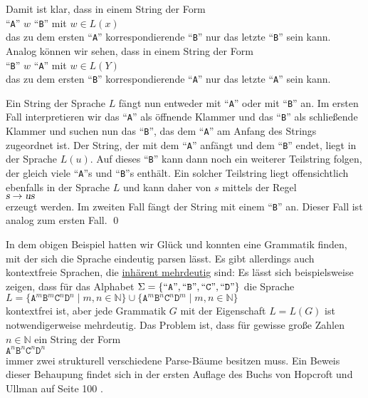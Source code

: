 Damit ist klar, dass in einem String der Form
\\[0.2cm]
\hspace*{1.3cm}
``\texttt{A}'' $w$ ``\texttt{B}'' \quad mit $w \in L(x)$ 
\\[0.2cm]
das zu dem ersten ``\texttt{A}'' korrespondierende ``\texttt{B}'' nur das letzte ``\texttt{B}'' sein kann.
Analog k\"onnen wir sehen, dass in einem String der Form
\\[0.2cm]
\hspace*{1.3cm}
``\texttt{B}'' $w$ ``\texttt{A}'' \quad mit $w \in L(Y)$ 
\\[0.2cm]
das zu dem ersten ``\texttt{B}'' korrespondierende ``\texttt{A}'' nur das letzte ``\texttt{A}'' sein kann.

Ein String der Sprache $L$ f\"angt nun entweder mit ``\texttt{A}'' oder mit ``\texttt{B}''
an.  Im ersten Fall interpretieren wir das ``\texttt{A}'' als \"offnende Klammer und 
das ``\texttt{B}'' als schlie{\ss}ende Klammer und suchen nun das ``\texttt{B}'', das dem
``\texttt{A}'' am Anfang des Strings zugeordnet ist.  Der String, der mit dem
``\texttt{A}'' anf\"angt und dem ``\texttt{B}'' endet, liegt in der Sprache $L(u)$.
Auf dieses ``\texttt{B}'' kann dann noch ein weiterer Teilstring folgen, der
gleich viele ``\texttt{A}''s und ``\texttt{B}''s enth\"alt.  Ein solcher Teilstring liegt
offensichtlich ebenfalls in der Sprache $L$ und kann daher von $s$ mittels der Regel
\\[0.2cm]
\hspace*{1.3cm}
$\textsl{s} \rightarrow \textsl{u}\textsl{s}$
\\[0.2cm]
erzeugt werden.
Im zweiten Fall f\"angt der String mit einem ``\texttt{B}'' an.  Dieser Fall ist
analog zum ersten Fall.    \qed
\vspace*{0.3cm}

In dem obigen Beispiel hatten wir Gl\"uck und konnten eine Grammatik finden, mit der sich
die Sprache eindeutig parsen l\"asst.  Es  gibt allerdings auch kontextfreie Sprachen, die 
\href{http://en.wikipedia.org/wiki/Ambiguous_grammar#Inherently_ambiguous_languages}{inh\"arent mehrdeutig}
sind: Es l\"asst sich beispielsweise zeigen, dass f\"ur das Alphabet 
$\Sigma =  \{ \mbox{``\texttt{A}''}, \mbox{``\texttt{B}''}, \mbox{``\texttt{C}''}, \mbox{``\texttt{D}''} \}$
die Sprache
\\[0.2cm]
\hspace*{1.3cm}
$L =  \bigl\{ \mathtt{A}^m \mathtt{B}^m \mathtt{C}^n \mathtt{D}^n \mid m, n \in \mathbb{N} \bigr\}
 \cup \bigl\{ \mathtt{A}^m \mathtt{B}^n \mathtt{C}^n \mathtt{D}^m \mid m, n \in \mathbb{N} \bigr\}
$
\\[0.2cm]
kontextfrei ist, aber jede Grammatik $G$ mit der Eigenschaft $L = L(G)$ ist
notwendigerweise mehrdeutig.  Das Problem ist, dass f\"ur gewisse gro{\ss}e Zahlen $n\in \mathbb{N}$ ein
String der Form 
\\[0.2cm]
\hspace*{1.3cm}
$\mathtt{A}^n \mathtt{B}^n \mathtt{C}^n \mathtt{D}^n$
\\[0.2cm]
immer zwei strukturell verschiedene Parse-B\"aume besitzen muss.  Ein Beweis dieser Behaupung
findet sich in der ersten Auflage des Buchs von  Hopcroft und Ullman auf Seite 100 \cite{hopcroft:79}.   

